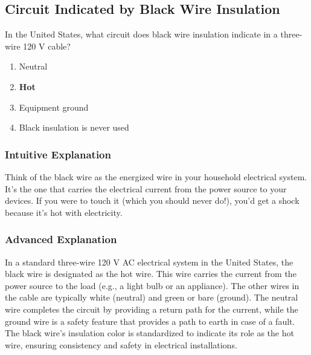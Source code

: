 \subsection{Circuit Indicated by Black Wire Insulation}
\label{T0A03}

\begin{tcolorbox}[colback=gray!10!white,colframe=black!75!black,title=T0A03]
In the United States, what circuit does black wire insulation indicate in a three-wire 120 V cable?
\begin{enumerate}[noitemsep]
    \item Neutral
    \item \textbf{Hot}
    \item Equipment ground
    \item Black insulation is never used
\end{enumerate}
\end{tcolorbox}

\subsubsection*{Intuitive Explanation}
Think of the black wire as the energized wire in your household electrical system. It's the one that carries the electrical current from the power source to your devices. If you were to touch it (which you should never do!), you'd get a shock because it's hot with electricity.

\subsubsection*{Advanced Explanation}
In a standard three-wire 120 V AC electrical system in the United States, the black wire is designated as the hot wire. This wire carries the current from the power source to the load (e.g., a light bulb or an appliance). The other wires in the cable are typically white (neutral) and green or bare (ground). The neutral wire completes the circuit by providing a return path for the current, while the ground wire is a safety feature that provides a path to earth in case of a fault. The black wire's insulation color is standardized to indicate its role as the hot wire, ensuring consistency and safety in electrical installations.